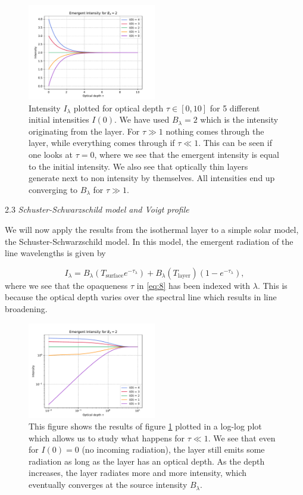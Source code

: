 \documentclass[a4paper,11.5pt,]{article}
\begin{document}
\begin{multicols}{2}
\begin{figure}[H]
	\centering
	\includegraphics[width=0.5\textwidth]{SSA/figures/opticaldepth.pdf}
	\caption{Intensity $I_\lambda$ plotted for optical depth $\tau \in [0,10]$ for 5 different initial intensities $I(0)$. We have used $B_\lambda = 2$ which is the intensity originating from the layer. For $\tau \gg 1$ nothing comes through the layer, while everything comes through if $\tau \ll 1$. This can be seen if one looks at $\tau = 0$, where we see that the emergent intensity is equal to the initial intensity. We also see that optically thin layers generate next to non intensity by themselves. All intensities end up converging to $B_\lambda$ for $\tau \gg 1$.}
	\label{fig:17}
\end{figure}
\begin{center}
2.3\textit{ Schuster-Schwarzschild model and Voigt profile}
\end{center}

We will now apply the results from the isothermal layer to a simple solar model, the Schuster-Schwarzschild model. In this model, the emergent radiation of the line wavelengths is given by

\begin{equation}\label{eq:8}
    I_\lambda = B_\lambda (T_\text{surface}e^{-\tau_\lambda }) + B_\lambda (T_\text{layer}) (1-e^{-\tau_\lambda}),
\end{equation}
where we see that the opaqueness $\tau$ in \eqref{eq:8} has been indexed with $\lambda$. This is because the optical depth varies over the spectral line which results in line broadening.
\begin{figure}[H]
	\centering
	\includegraphics[width=0.5\textwidth]{SSA/figures/opticaldepthlog.pdf}
	\caption{This figure shows the results of figure \ref{fig:17} plotted in a log-log plot which allows us to study what happens for $\tau \ll 1$. We see that even for  $I(0) = 0$ (no incoming radiation), the layer still emits some radiation as long as the layer has an optical depth. As the depth increases, the layer radiates more and more intensity, which eventually converges at the source intensity $B_\lambda$.}
	\label{fig:18}
\end{figure}


\end{multicols}
\end{document}
